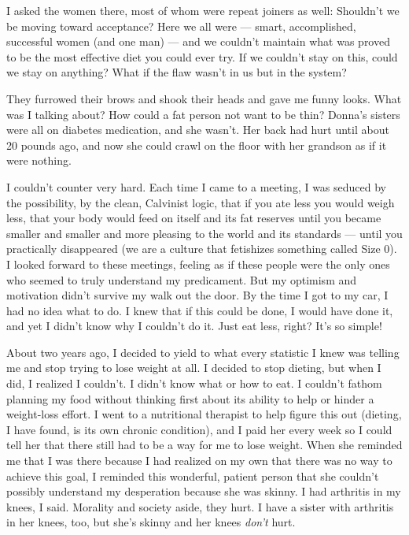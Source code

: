 I asked the women there, most of whom were repeat joiners as well:
Shouldn't we be moving toward acceptance? Here we all were --- smart,
accomplished, successful women (and one man) --- and we couldn't
maintain what was proved to be the most effective diet you could ever
try. If we couldn't stay on this, could we stay on anything? What if the
flaw wasn't in us but in the system?

They furrowed their brows and shook their heads and gave me funny looks.
What was I talking about? How could a fat person not want to be thin?
Donna's sisters were all on diabetes medication, and she wasn't. Her
back had hurt until about 20 pounds ago, and now she could crawl on the
floor with her grandson as if it were nothing.

I couldn't counter very hard. Each time I came to a meeting, I was
seduced by the possibility, by the clean, Calvinist logic, that if you
ate less you would weigh less, that your body would feed on itself and
its fat reserves until you became smaller and smaller and more pleasing
to the world and its standards --- until you practically disappeared (we
are a culture that fetishizes something called Size 0). I looked forward
to these meetings, feeling as if these people were the only ones who
seemed to truly understand my predicament. But my optimism and
motivation didn't survive my walk out the door. By the time I got to my
car, I had no idea what to do. I knew that if this could be done, I
would have done it, and yet I didn't know why I couldn't do it. Just eat
less, right? It's so simple!

About two years ago, I decided to yield to what every statistic I knew
was telling me and stop trying to lose weight at all. I decided to stop
dieting, but when I did, I realized I couldn't. I didn't know what or
how to eat. I couldn't fathom planning my food without thinking first
about its ability to help or hinder a weight-loss effort. I went to a
nutritional therapist to help figure this out (dieting, I have found, is
its own chronic condition), and I paid her every week so I could tell
her that there still had to be a way for me to lose weight. When she
reminded me that I was there because I had realized on my own that there
was no way to achieve this goal, I reminded this wonderful, patient
person that she couldn't possibly understand my desperation because she
was skinny. I had arthritis in my knees, I said. Morality and society
aside, they hurt. I have a sister with arthritis in her knees, too, but
she's skinny and her knees \emph{don't} hurt.

